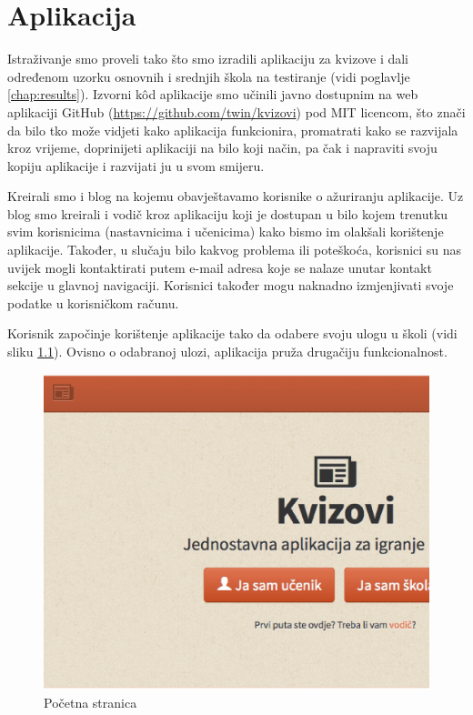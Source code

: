 \documentclass{scrreprt}
\begin{document}
\chapter{Aplikacija}

Istraživanje smo proveli tako što smo izradili aplikaciju za kvizove i dali
određenom uzorku osnovnih i srednjih škola na testiranje (vidi poglavlje
\ref{chap:results}). Izvorni kôd aplikacije smo učinili javno dostupnim na web
aplikaciji GitHub (\url{https://github.com/twin/kvizovi}) pod MIT licencom, što
znači da bilo tko može vidjeti kako aplikacija funkcionira, promatrati kako se
razvijala kroz vrijeme, doprinijeti aplikaciji na bilo koji način, pa čak i
napraviti svoju kopiju aplikacije i razvijati ju u svom
smijeru.\cite{mit}

Kreirali smo i blog na kojemu obavještavamo korisnike o ažuriranju aplikacije.
Uz blog smo kreirali i vodič kroz aplikaciju koji je dostupan u bilo kojem
trenutku svim korisnicima (nastavnicima i učenicima) kako bismo im olakšali
korištenje aplikacije. Također, u slučaju bilo kakvog problema ili poteškoća,
korisnici su nas uvijek mogli kontaktirati putem e-mail adresa koje se nalaze
unutar kontakt sekcije u glavnoj navigaciji. Korisnici također mogu naknadno
izmjenjivati svoje podatke u korisničkom računu.

Korisnik započinje korištenje aplikacije tako da odabere svoju ulogu u školi
(vidi sliku \ref{fig:home}). Ovisno o odabranoj ulozi, aplikacija pruža drugačiju
funkcionalnost.

\begin{figure}[H]
  \includegraphics[width=\textwidth, clip=true, trim=0 7cm 0 0, fbox]{home}
  \caption{Početna stranica}
  \label{fig:home}
\end{figure}
\end{document}
